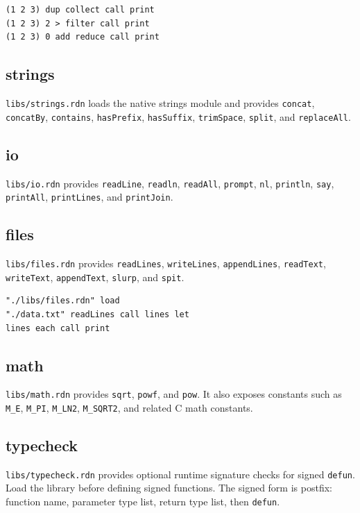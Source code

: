 \documentclass[11pt,a4paper]{article}
\newcommand{\code}[1]{\texttt{#1}}
\begin{document}
\begin{lstlisting}[language=Raden]
(1 2 3) dup collect call print
(1 2 3) 2 > filter call print
(1 2 3) 0 add reduce call print
\end{lstlisting}

\subsection{strings}

\code{libs/strings.rdn} loads the native strings module and provides
\code{concat}, \code{concatBy}, \code{contains}, \code{hasPrefix},
\code{hasSuffix}, \code{trimSpace}, \code{split}, and \code{replaceAll}.

\subsection{io}

\code{libs/io.rdn} provides \code{readLine}, \code{readln},
\code{readAll}, \code{prompt}, \code{nl}, \code{println}, \code{say},
\code{printAll}, \code{printLines}, and \code{printJoin}.

\subsection{files}

\code{libs/files.rdn} provides \code{readLines}, \code{writeLines},
\code{appendLines}, \code{readText}, \code{writeText},
\code{appendText}, \code{slurp}, and \code{spit}.

\begin{lstlisting}[language=Raden]
"./libs/files.rdn" load
"./data.txt" readLines call lines let
lines each call print
\end{lstlisting}

\subsection{math}

\code{libs/math.rdn} provides \code{sqrt}, \code{powf}, and \code{pow}.
It also exposes constants such as \code{M\_E}, \code{M\_PI},
\code{M\_LN2}, \code{M\_SQRT2}, and related C math constants.

\subsection{typecheck}

\code{libs/typecheck.rdn} provides optional runtime signature checks for
signed \code{defun}. Load the library before defining signed functions.
The signed form is postfix: function name, parameter type list, return
type list, then \code{defun}.
\end{document}
